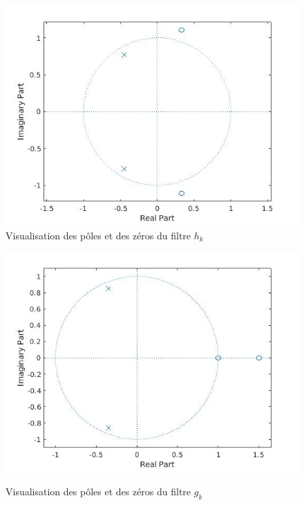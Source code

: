 \documentclass[12,french]{report}
\begin{document}
\begin{figure}[H]
    \begin{minipage}[c]{.50\linewidth}
        \centering
        \includegraphics[width=1\textwidth]{./Images/zplane_H}\\
        \caption{Visualisation des pôles et des zéros du filtre $h_k$}
    \end{minipage}
    \hfill%
    \begin{minipage}[c]{.50\linewidth}
        \centering
        \includegraphics[width=1\textwidth]{./Images/zplane_G}\\
        \caption{Visualisation des pôles et des zéros du filtre $g_k$}
    \end{minipage}
\end{figure}\vspace{0.3cm}
\end{document}
